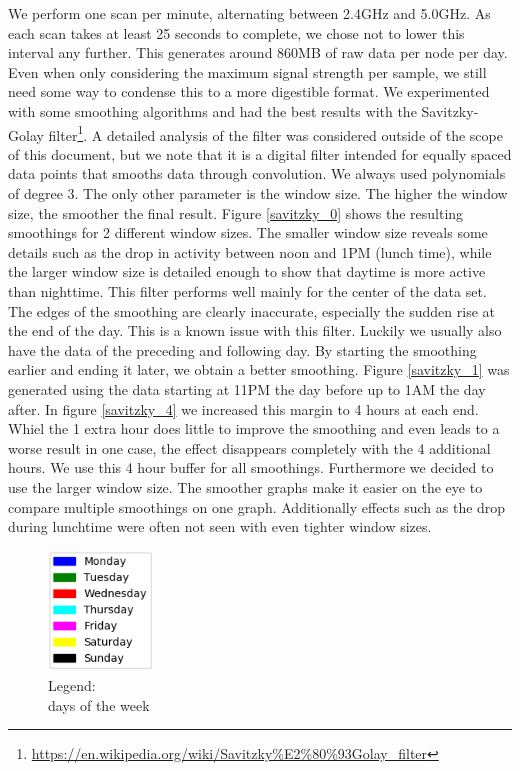 \documentclass[a4paper, 11pt]{article}
\begin{document}
We perform one scan per minute, alternating between 2.4GHz and 5.0GHz. As each scan takes at least 25 seconds to complete, we chose not to lower this interval any further. This generates around 860MB of raw data per node per day. Even when only considering the maximum signal strength per sample, we still need some way to condense this to a more digestible format. We experimented with some smoothing algorithms and had the best results with the Savitzky-Golay filter\footnote{\url{https://en.wikipedia.org/wiki/Savitzky\%E2\%80\%93Golay_filter}}. A detailed analysis of the filter was considered outside of the scope of this document, but we note that it is a digital filter intended for equally spaced data points that smooths data through convolution. We always used polynomials of degree 3. The only other parameter is the window size. The higher the window size, the smoother the final result. Figure \ref{savitzky_0} shows the resulting smoothings for 2 different window sizes. The smaller window size reveals some details such as the drop in activity between noon and 1PM (lunch time), while the larger window size is detailed enough to show that daytime is more active than nighttime. This filter performs well mainly for the center of the data set. The edges of the smoothing are clearly inaccurate, especially the sudden rise at the end of the day. This is a known issue with this filter. Luckily we usually also have the data of the preceding and following day. By starting the smoothing earlier and ending it later, we obtain a better smoothing. Figure \ref{savitzky_1} was generated using the data starting at 11PM the day before up to 1AM the day after. In figure \ref{savitzky_4} we increased this margin to 4 hours at each end. Whiel the 1 extra hour does little to improve the smoothing and even leads to a worse result in one case, the effect disappears completely with the 4 additional hours. We use this 4 hour buffer for all smoothings. Furthermore we decided to use the larger window size. The smoother graphs make it easier on the eye to compare multiple smoothings on one graph. Additionally effects such as the drop during lunchtime were often not seen with even tighter window sizes.\\
\newpage
\begin{figure}
\centering
\captionsetup{justification=centering}
\includegraphics[width=0.25\textwidth]{legend.png}
\caption{Legend:\\ days of the week}
\label{legend}
\end{figure}
\end{document}
